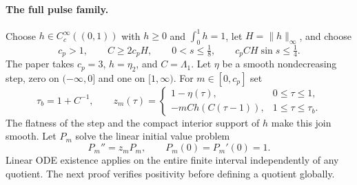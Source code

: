 \documentclass[11pt]{article}
\begin{document}
\paragraph{The full pulse family.}
Choose $h\in C_c^\infty((0,1))$ with $h\geq0$ and
$\int_0^1h=1$, let $H=\|h\|_\infty$, and choose
\[
 c_p>1,\qquad C\geq2c_pH,\qquad
 0<s\leq\tfrac18,\qquad c_pCH\sin s\leq\tfrac14.
\]
The paper takes $c_p=3$, $h=\eta_2$, and $C=\Lambda _1$.
Let $\eta$ be a smooth nondecreasing step, zero on $(-\infty,0]$
and one on $[1,\infty)$. For $m\in[0,c_p]$ set
\[
 \tau_b=1+C^{-1},\qquad
 z_m(\tau)=\begin{cases}1-\eta(\tau),&0\leq\tau\leq1,\\
 -mC h(C(\tau-1)),&1\leq\tau\leq\tau_b.
 \end{cases}
\]
The flatness of the step and the compact interior support of $h$ make
this join smooth. Let $P_m$ solve the linear initial value problem
\begin{equation}\label{eq:P}
 P_m''=z_mP_m,\qquad P_m(0)=P_m'(0)=1.
\end{equation}
Linear ODE existence applies on the entire finite interval independently
of any quotient. The next proof verifies positivity before defining a
quotient globally.
\end{document}
